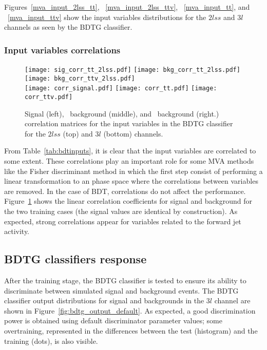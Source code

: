Figures~\ref{mva_input_2lss_tt}, ~\ref{mva_input_2lss_ttv}, ~\ref{mva_input_tt}, and ~\ref{mva_input_ttv} show the input variables distributions for the $2lss$ and $3l$ channels as seen by the BDTG classifier. 

\subsubsection*{Input variables correlations}

\begin{figure} [!ht]
  \centering
      \texttt{[image: sig\_corr\_tt\_2lss.pdf]}
      \texttt{[image: bkg\_corr\_tt\_2lss.pdf]}
      \texttt{[image: bkg\_corr\_ttv\_2lss.pdf]}\\
      \texttt{[image: corr\_signal.pdf]}
      \texttt{[image: corr\_tt.pdf]}
      \texttt{[image: corr\_ttv.pdf]}
\caption[Correlation matrices for the BDT input variables.]{ Signal (left), \ttbar\ background (middle), and \ttV\ background (right.) correlation matrices for the input variables in the BDTG classifier for the $2lss$ (top) and  $3l$ (bottom) channels.}
\label{mva_corr}
\end{figure}

From Table~\ref{tab:bdtinputs}, it is clear that the input variables are correlated to some extent. These correlations play an important role for some MVA methods like the Fisher discriminant method in which the first step consist of performing a linear transformation to an phase space where the correlations between variables are removed. In the case of BDT, correlations do not affect the performance. Figure~\ref{mva_corr} shows the linear correlation coefficients for signal and background for the two training cases (the signal values are identical by construction). As expected, strong correlations appear for variables related to the forward jet activity.

\subsection{BDTG classifiers response}

After the training stage, the BDTG classifier is tested to ensure its ability to discriminate between simulated signal and background events. The BDTG classifier output distributions for signal and backgrounds in the $3l$ channel are shown in Figure~\ref{fig:bdtg_output_default}. As expected, a good discrimination power is obtained using default discriminator parameter values; some overtraining, represented in the differences between the test (histogram) and the training (dots), is also visible.

